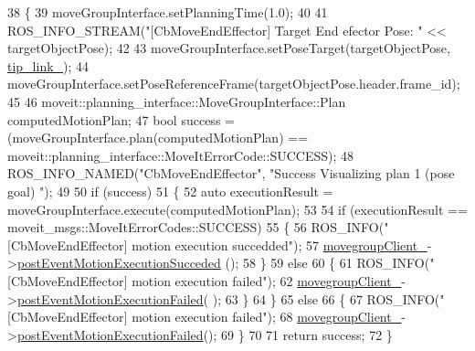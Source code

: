 \begin{DoxyCode}
38 \{
39     moveGroupInterface.setPlanningTime(1.0);
40 
41     ROS\_INFO\_STREAM(\textcolor{stringliteral}{"[CbMoveEndEffector] Target End efector Pose: "} << targetObjectPose);
42 
43     moveGroupInterface.setPoseTarget(targetObjectPose, \hyperlink{classmoveit__z__client_1_1CbMoveEndEffector_abd92e9d3d67bdde11f9e38e0b44a2b8b}{tip\_link\_});
44     moveGroupInterface.setPoseReferenceFrame(targetObjectPose.header.frame\_id);
45 
46     moveit::planning\_interface::MoveGroupInterface::Plan computedMotionPlan;
47     \textcolor{keywordtype}{bool} success = (moveGroupInterface.plan(computedMotionPlan) == 
      moveit::planning\_interface::MoveItErrorCode::SUCCESS);
48     ROS\_INFO\_NAMED(\textcolor{stringliteral}{"CbMoveEndEffector"}, \textcolor{stringliteral}{"Success Visualizing plan 1 (pose goal) %
      "});
49 
50     \textcolor{keywordflow}{if} (success)
51     \{
52         \textcolor{keyword}{auto} executionResult = moveGroupInterface.execute(computedMotionPlan);
53 
54         \textcolor{keywordflow}{if} (executionResult == moveit\_msgs::MoveItErrorCodes::SUCCESS)
55         \{
56             ROS\_INFO(\textcolor{stringliteral}{"[CbMoveEndEffector] motion execution succedded"});
57             \hyperlink{classmoveit__z__client_1_1CbMoveEndEffector_af62a434c16849885a085e30b8ae70e00}{movegroupClient\_}->\hyperlink{classmoveit__z__client_1_1ClMoveGroup_ad6b8f0acbe3d11b5c39a83911a3d95b8}{postEventMotionExecutionSucceded}
      ();
58         \}
59         \textcolor{keywordflow}{else}
60         \{
61             ROS\_INFO(\textcolor{stringliteral}{"[CbMoveEndEffector] motion execution failed"});
62             \hyperlink{classmoveit__z__client_1_1CbMoveEndEffector_af62a434c16849885a085e30b8ae70e00}{movegroupClient\_}->\hyperlink{classmoveit__z__client_1_1ClMoveGroup_a42bede73264ae2d5dfe0117315042acb}{postEventMotionExecutionFailed}(
      );
63         \}
64     \}
65     \textcolor{keywordflow}{else}
66     \{
67         ROS\_INFO(\textcolor{stringliteral}{"[CbMoveEndEffector] motion execution failed"});
68         \hyperlink{classmoveit__z__client_1_1CbMoveEndEffector_af62a434c16849885a085e30b8ae70e00}{movegroupClient\_}->\hyperlink{classmoveit__z__client_1_1ClMoveGroup_a42bede73264ae2d5dfe0117315042acb}{postEventMotionExecutionFailed}();
69     \}
70 
71     \textcolor{keywordflow}{return} success;
72 \}
\end{DoxyCode}


